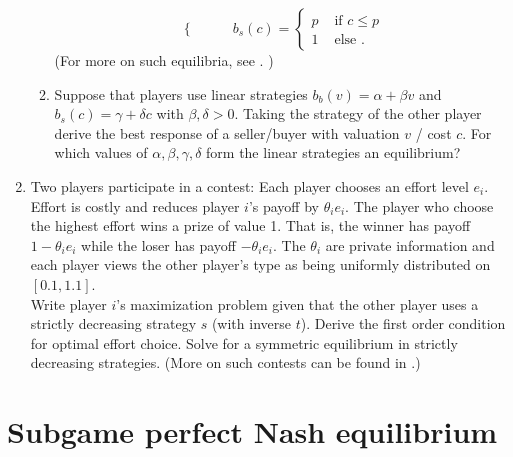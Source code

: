 \documentclass[a4paper,12pt]{article}
\begin{document}
\begin{enumerate}
\begin{enumerate}
\begin{equation*}
\begin{cases}
      \end{cases}
    \qquad
      b_s(c)=
      \begin{cases}
        p & \text{ if }c\leq p\\
        1 & \text{ else }.
      \end{cases}
    \end{equation*}
    (For more on such equilibria, see \cite{leininger1989equilibria}. )
    \item Suppose that players use linear strategies $b_b(v)=\alpha+\beta v$ and $b_s(c)=\gamma+\delta c$ with $\beta,\delta>0$. Taking the strategy of the other player derive the best response of a seller/buyer with valuation $v$ / cost $c$. For which values of $\alpha,\beta,\gamma,\delta$ form the linear strategies an equilibrium?
    \end{enumerate}
  \item Two players participate in a contest: Each player chooses an effort level $e_i$. Effort is costly and reduces player $i$'s payoff by  $\theta _ie_i$. The player who choose the highest effort wins a prize of value 1. That is, the winner has payoff $1-\theta _i e_i$ while the loser has payoff $-\theta _i e_i$. The $\theta _i$ are private information and each player views the other player's type as being uniformly distributed on $[0.1,1.1]$. \\
    Write player $i$'s maximization problem given that the other player uses a strictly decreasing strategy $s$ (with inverse $t$). Derive the first order condition for optimal effort choice. Solve for a symmetric equilibrium in strictly decreasing strategies.
    (More on such contests can be found in \cite{moldovanu2001optimal}.)
\end{enumerate}

\section{Subgame perfect Nash equilibrium}
\label{sec:subgame-perfect-nash}
\end{document}

